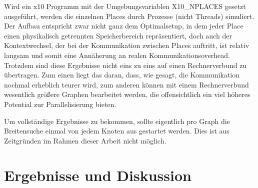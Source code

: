 Wird ein x10 Programm mit der Umgebungsvariablen X10\_NPLACES gesetzt ausgeführt, werden die einzelnen Places durch Prozesse (nicht Threads) simuliert. Der Aufbau entspricht zwar nicht ganz dem Optimalsetup, in dem jeder Place einen physikalisch getrennten Speicherbereich repräsentiert, doch auch der Kontextwechsel, der bei der Kommunikation zwischen Places auftritt, ist relativ langsam und somit eine Annäherung an realen Kommunikationsoverhead. Trotzdem sind diese Ergebnisse nicht eins zu eins auf einen Rechnerverbund zu übertragen. Zum einen liegt das daran, dass, wie gesagt, die Kommunikation nochmal erheblich teurer wird, zum anderen können mit einem Rechnerverbund wesentlich größere Graphen bearbeitet werden, die offensichtlich ein viel höheres Potential zur Parallelisierung bieten.

Um vollständige Ergebnisse zu bekommen, sollte eigentlich pro Graph die Breitensuche einmal von jedem Knoten aus gestartet werden. Dies ist aus Zeitgründen im Rahmen dieser Arbeit nicht möglich.       

\chapter{Ergebnisse und Diskussion} %
\label{cha:ergebnisse_und_diskussion}


